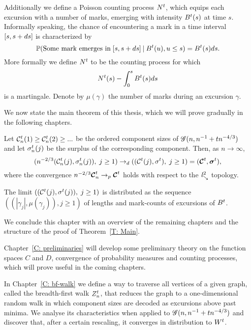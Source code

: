Additionally we define a Poisson counting process $N^t$, 
which equips each excursion with a number of marks,
emerging with intensity $B^t(s)$ at time $s$.
Informally speaking, the chance of encountering a mark in a time interval $[s, s+ds]$ is characterized by
\begin{equation}
	\mathbb{P}( \text{Some mark emerges in} \; [s, s+ds] \: | \: B^t(u), u \leq s ) = B^t(s)ds.
\end{equation}
More formally we define $N^t$ to be the counting process for which
\begin{equation}
	N^t(s) - \int_{0}^{s} B^t(s)ds
\end{equation}
is a martingale.
Denote by $\mu(\gamma)$ the number of marks during an excursion $\gamma$.

We now state the main theorem of this thesis, which we will prove gradually in the following chapters.
\begin{theorem} \label{T: Main}
	Let 
	$\mathcal{C}^t_n(1) \geq \mathcal{C}^t_n(2) \geq ... $ 
	be the ordered component sizes of 
	$\mathscr{G}(n, n^{-1} + tn^{-4/3})$
	and let
	$\mathcal{\sigma}^t_n(j)$ 
	be the surplus of the corresponding component.
	Then, as $n \rightarrow \infty$,
	\begin{equation}
	( n^{-2 / 3} ( \mathcal{C}^t_n(j), \mathcal{\sigma}^t_n(j) ), \; j \geq 1 ) 
	\rightarrow_d
	( (\mathcal{C}^t(j), \mathcal{\sigma}^t), \; j \geq 1 )
	= ( \boldsymbol{\mathcal{C}}^t, \boldsymbol{\mathcal{\sigma}}^t ),
	\end{equation}
	where the convergence 
	$n^{-2 / 3} \boldsymbol{\mathcal{C}}^t_n \rightarrow_p \boldsymbol{\mathcal{C}}^t$
	holds with respect to the $\mathit{l}^2_{\searrow}$ topology.
	
	The limit
	$\left( ( \mathcal{C}^t(j), \mathcal{\sigma}^t(j) ), \; j \geq 1 \right)$
	is distributed as the sequence
	$ \left( (|\gamma_j|, \mu(\gamma_j)), j \geq 1  \right) $
	of lengths and mark-counts of excursions of $B^t$.
\end{theorem}

We conclude this chapter with an overview of the remaining chapters and the structure of the proof of Theorem~\ref{T: Main}.

Chapter~\ref{C: preliminaries} will develop some preliminary theory on the function spaces $C$ and $D$,
convergence of probability measures and counting processes, which will prove useful in the coming chapters.

In Chapter~\ref{C: bf-walk} we define a way to traverse all vertices of a given graph, called the breadth-first walk $Z_n^t$, 
that reduces the graph to a one-dimensional random walk in which component sizes are decoded as excursions above past minima.
We analyse its characteristics when applied to $\mathscr{G}(n, n^{-1} + tn^{-4/3})$ and discover that, after a certain rescaling, it converges in distribution to $W^t$.

